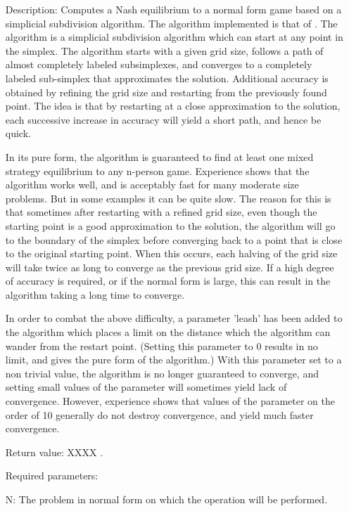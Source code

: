 \begin{itemize}
\bd
\item
[Description:] Computes a Nash equilibrium to a normal form game based
on a simplicial subdivision algorithm.  The algorithm implemented is
that of \cite{VTH:1987}.  The 
algorithm is a simplicial subdivision algorithm which can start at any
point in the simplex.  The algorithm starts with a given grid size,
follows a path of almost completely labeled subsimplexes, and
converges to a completely labeled sub-simplex that approximates the
solution.  Additional accuracy is obtained by refining the grid size
and restarting from the previously found point.  The idea is that by
restarting at a close approximation to the solution, each successive
increase in accuracy will yield a short path, and hence be quick.

In its pure form, the algorithm is guaranteed to find at least one
mixed strategy equilibrium to any n-person game.  Experience shows
that the algorithm works well, and is acceptably fast for many
moderate size problems.  But in some examples it can be quite slow.
The reason for this is that sometimes after restarting with a refined
grid size, even though the starting point is a good approximation to
the solution, the algorithm will go to the boundary of the simplex
before converging back to a point that is close to the original
starting point.  When this occurs, each halving of the grid size will
take twice as long to converge as the previous grid size.  If a high
degree of accuracy is required, or if the normal form is large, this
can result in the algorithm taking a long time to converge.

In order to combat the above difficulty, a parameter 'leash' has been
added to the algorithm which places a limit on the distance which the
algorithm can wander from the restart point. (Setting this parameter
to 0 results in no limit, and gives the pure form of the algorithm.)
With this parameter set to a non trivial value, the algorithm is no
longer guaranteed to converge, and setting small values of the
parameter will sometimes yield lack of convergence.  However,
experience shows that values of the parameter on the order of 10
generally do not destroy convergence, and yield much faster
convergence.

\item
[Return value:] XXXX .
\item
[Required parameters:]\hfil\null

\bd
\item
[N:] The problem in normal form on which the operation will be
performed.
\ed


\end{itemize}
